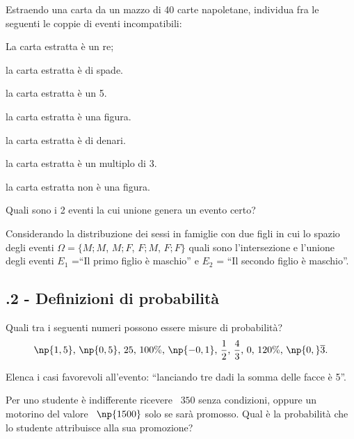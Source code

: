 \begin{esercizio}
 \label{ese:9.4}
Estraendo una carta da un mazzo di 40 carte napoletane, individua fra le seguenti le coppie di eventi incompatibili:
\begin{multicols}{2}
\begin{enumeratea}
\item La carta estratta è un re;
\item la carta estratta è di spade.
\item la carta estratta è un 5.
\item la carta estratta è una figura.
\item la carta estratta è di denari.
\item la carta estratta è un multiplo di 3.
\item la carta estratta non è una figura.
\end{enumeratea}
\end{multicols}
Quali sono i 2 eventi la cui unione genera un evento certo?
\end{esercizio}

\begin{esercizio}
 \label{ese:9.5}
 Considerando la distribuzione dei sessi in famiglie con due figli in cui lo spazio degli eventi $\Omega =\{{M;M}$, ${M;F}$, ${F;M}$, ${F;F}\}$ quali sono l'intersezione e l'unione degli eventi $E_1$ =``Il primo figlio è maschio'' e $E_2$ = ``Il secondo figlio è maschio''.
\end{esercizio}

\subsection*{\thechapter.2 - Definizioni di probabilità}

\begin{esercizio}
 \label{ese:9.6}
Quali tra i seguenti numeri possono essere misure di probabilità? \[ \np{1,5}\text{, }\np{0,5}\text{, }25\text{, }100\%\text{, }\np{-0,1}\text{, }\frac 1 2\text{, }\frac 4 3\text{, }0\text{, }120\%\text{, }\np{0,}\overline{3}. \]
\end{esercizio}

\begin{esercizio}
 \label{ese:9.7}
Elenca i casi favorevoli all'evento: ``lanciando tre dadi la somma delle facce è 5''.
\end{esercizio}

\begin{esercizio}[\Ast]
 \label{ese:9.8}
Per uno studente è indifferente ricevere \officialeuro~$350$ senza condizioni, oppure un motorino del valore \officialeuro~$\np{1500}$ solo se sarà promosso. Qual è la probabilità che lo studente attribuisce alla sua promozione?
\end{esercizio}

